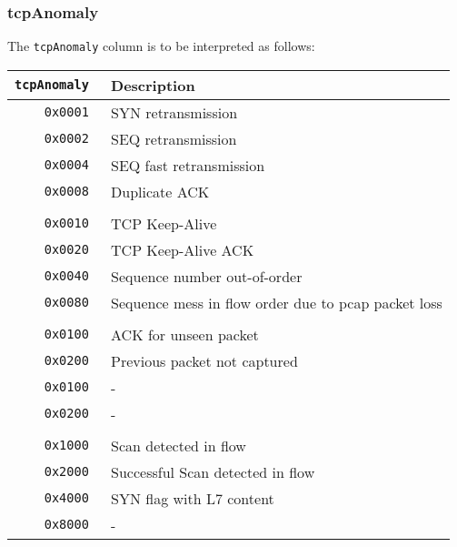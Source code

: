 \documentclass[documentation]{subfiles}
\begin{document}
\subsubsection{tcpAnomaly}\label{tcpAnomaly}
The {\tt tcpAnomaly} column is to be interpreted as follows:
\begin{longtable}{>{\tt}rl}
    \toprule
    {\bf tcpAnomaly} & {\bf Description}\\
    \midrule\endhead%
    0x0001 & SYN retransmission\\
    0x0002 & SEQ retransmission\\
    0x0004 & SEQ fast retransmission\\
    0x0008 & Duplicate ACK\\
    \\
    0x0010 & TCP Keep-Alive\\
    0x0020 & TCP Keep-Alive ACK\\
    0x0040 & Sequence number out-of-order\\
    0x0080 & Sequence mess in flow order due to pcap packet loss\\
    \\
    0x0100 & ACK for unseen packet\\
    0x0200 & Previous packet not captured\\
    0x0100 & -\\
    0x0200 & -\\
    \\
    0x1000 & Scan detected in flow\\
    0x2000 & Successful Scan detected in flow\\
    0x4000 & SYN flag with L7 content\\
    0x8000 & -\\
    \bottomrule
\end{longtable}
\end{document}
